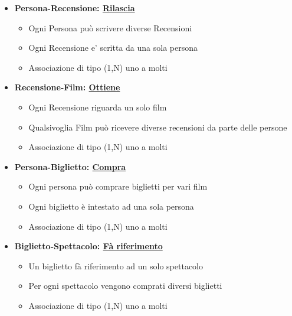 \documentclass[10pt]{article}
\begin{document}
\begin{itemize}
		\item {\textbf{Persona-Recensione: \underline{Rilascia}}
		    \begin{itemize}
			    \item Ogni Persona può scrivere diverse Recensioni 
			    \item Ogni Recensione e' scritta da una sola persona 
			    \item Associazione di tipo (1,N) uno a molti
		    \end{itemize}}  
		    
		\item {\textbf{Recensione-Film: \underline{Ottiene}}
		    \begin{itemize}
			    \item  Ogni Recensione riguarda un solo film
			    \item  Qualsivoglia Film può ricevere diverse recensioni da parte delle persone 			    
			    \item Associazione di tipo (1,N) uno a molti
		    \end{itemize}}  
		    
		\item {\textbf{Persona-Biglietto: \underline{Compra}}
		    \begin{itemize}
			    \item  Ogni persona può comprare biglietti per vari film
			    \item  Ogni biglietto è intestato ad una sola persona
			    \item Associazione di tipo (1,N) uno a molti
		    \end{itemize}}  
		
		\item {\textbf{Biglietto-Spettacolo: \underline{Fà riferimento}}
		    \begin{itemize}
			    \item  Un biglietto fà riferimento ad un solo spettacolo
			    \item  Per ogni spettacolo vengono comprati diversi biglietti
			    \item Associazione di tipo (1,N) uno a molti
		    \end{itemize}}		 
    \end{itemize}
\end{document}

